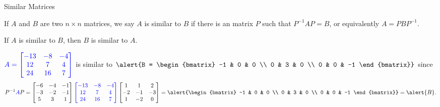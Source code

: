 \documentclass[xcolor=dvipsnames,aspectratio=169,t]{beamer}
\begin{document}
\begin{frame}{Similar Matrices}
  \medskip
  
  \begin{definition}
  If $A$ and $B$ are two $n \times n$ matrices, we say \alert{$A$ is similar to $B$} if there is an  matrix $P$ such that \alert{$P^{-1}AP=B$}, or equivalently $A = PBP^{-1}$.
  \end{definition}
  \bi
  \ii If $A$ is similar to $B$, then $B$ is similar to $A$.
  \ei
  \vspace*{2em}

  \pause
  $\textcolor{blue}{A = \begin{bmatrix} -13 & -8 & -4 \\ 12 & 7 & 4 \\ 24 & 16 & 7 \end{bmatrix}}$  is similar to $\alert{B = \begin{bmatrix} -1 & 0 & 0 \\ 0 & 3 & 0 \\ 0 & 0 & -1 \end{bmatrix}}$ since 
  \[ P^{-1}\colorb{A}P  =
  \begin{bmatrix} -6 & -4 & -1 \\ -3 & -2 & -1 \\ 5 & 3 & 1 \end{bmatrix}
  \colorb{\begin{bmatrix} -13 & -8 & -4 \\ 12 & 7 & 4 \\ 24 & 16 & 7 \end{bmatrix} }
  \begin{bmatrix} 1 & 1 & 2 \\ -2 & -1 & -3 \\ 1 & -2 & 0 \end{bmatrix}  =
  \alert{\begin{bmatrix} -1 & 0 & 0 \\ 0 & 3 & 0 \\ 0 & 0 & -1 \end{bmatrix}} = \alert{B}. \]
\end{frame}
\end{document}
